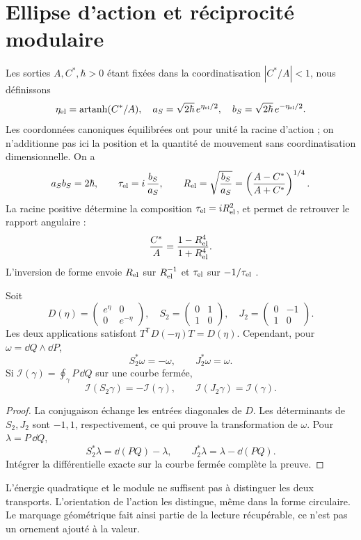 \section{Ellipse d’action et réciprocité modulaire}
\label{sec:ellipse}
Les sorties $A,C^*,\hbar>0$ étant fixées dans la coordinatisation
$|C^*/A|<1$, nous définissons
\[
\eta_{\rm el}=\operatorname{artanh}(C^*/A),\quad
a_S=\sqrt{2\hbar}\,e^{\eta_{\rm el}/2},\quad
b_S=\sqrt{2\hbar}\,e^{-\eta_{\rm el}/2}.
\]
Les coordonnées canoniques équilibrées ont pour unité la racine d’action ;
on n’additionne pas ici la position et la quantité de mouvement sans coordinatisation dimensionnelle.
On a
\[
a_Sb_S=2\hbar,\qquad
\tau_{\rm el}=i\,\frac{b_S}{a_S},\qquad
R_{\rm el}=\sqrt{\frac{b_S}{a_S}}
=\left(\frac{A-C^*}{A+C^*}\right)^{1/4}.
\]
La racine positive détermine la composition $\tau_{\rm el}=iR_{\rm el}^2$,
et permet de retrouver le rapport angulaire :
\[
\frac{C^*}{A}=\frac{1-R_{\rm el}^4}{1+R_{\rm el}^4}.
\]
L’inversion de forme envoie $R_{\rm el}$ sur $R_{\rm el}^{-1}$ et
$\tau_{\rm el}$ sur $-1/\tau_{\rm el}$ \cite{elipse}.

\begin{proposition}
Soit
\[
D(\eta)=\begin{pmatrix}e^\eta&0\\0&e^{-\eta}\end{pmatrix},
\quad
S_2=\begin{pmatrix}0&1\\1&0\end{pmatrix},
\quad
J_2=\begin{pmatrix}0&-1\\1&0\end{pmatrix}.
\]
Les deux applications satisfont $T^{\mathsf T}D(-\eta)T=D(\eta)$.
Cependant, pour $\omega=\dd Q\wedge\dd P$,
\[
S_2^*\omega=-\omega,\qquad J_2^*\omega=\omega.
\]
Si $\mathcal I(\gamma)=\oint_\gamma P\,\dd Q$ sur une courbe fermée,
\[
\mathcal I(S_2\gamma)=-\mathcal I(\gamma),\qquad
\mathcal I(J_2\gamma)=\mathcal I(\gamma).
\]
\end{proposition}
\begin{proof}
La conjugaison échange les entrées diagonales de $D$.
Les déterminants de $S_2,J_2$ sont $-1,1$, respectivement, ce qui
prouve la transformation de $\omega$. Pour $\lambda=P\,\dd Q$,
\[
S_2^*\lambda=\dd(PQ)-\lambda,\qquad
J_2^*\lambda=\lambda-\dd(PQ).
\]
Intégrer la différentielle exacte sur la courbe fermée complète la preuve.
\end{proof}

L’énergie quadratique et le module ne suffisent pas à distinguer les deux
transports. L’orientation de l’action les distingue, même
dans la forme circulaire. Le marquage géométrique fait ainsi partie de la lecture
récupérable, ce n’est pas un ornement ajouté à la valeur.
